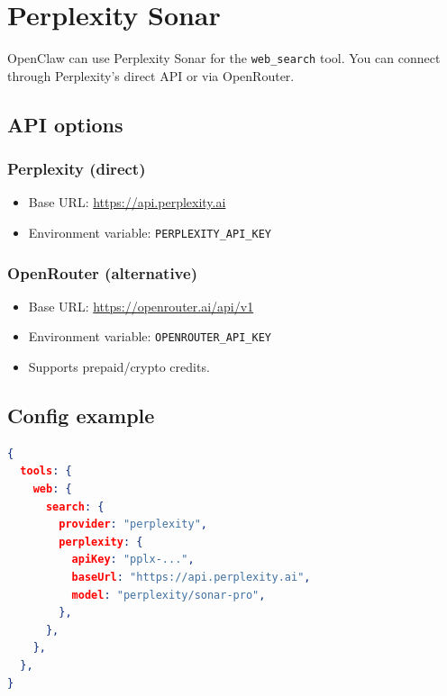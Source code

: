 \clearpage

\section{Perplexity Sonar}


OpenClaw can use Perplexity Sonar for the \texttt{web\_search} tool. You can connect
through Perplexity’s direct API or via OpenRouter.

\subsection{API options}


\subsubsection{Perplexity (direct)}


\begin{itemize}
  \item Base URL: \href{https://api.perplexity.ai}{https://api.perplexity.ai}
  \item Environment variable: \texttt{PERPLEXITY\_API\_KEY}
\end{itemize}


\subsubsection{OpenRouter (alternative)}


\begin{itemize}
  \item Base URL: \href{https://openrouter.ai/api/v1}{https://openrouter.ai/api/v1}
  \item Environment variable: \texttt{OPENROUTER\_API\_KEY}
  \item Supports prepaid/crypto credits.
\end{itemize}


\subsection{Config example}


\begin{lstlisting}[language=json]
{
  tools: {
    web: {
      search: {
        provider: "perplexity",
        perplexity: {
          apiKey: "pplx-...",
          baseUrl: "https://api.perplexity.ai",
          model: "perplexity/sonar-pro",
        },
      },
    },
  },
}
\end{lstlisting}


